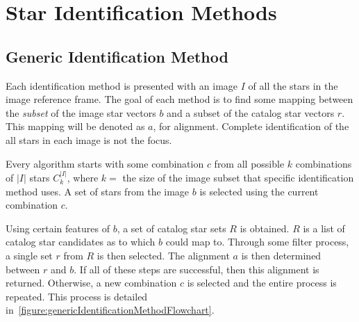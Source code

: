 \section{Star Identification Methods}\label{sec:starIdentificationMethods}

\subsection{Generic Identification Method}\label{subsec:genericIdentificationMethod}
Each identification method is presented with an image $I$ of all the stars in the image reference frame. The goal of
each method is to find some mapping between the \textit{subset} of the image star vectors $b$ and a subset of the
catalog star vectors $r$. This mapping will be denoted as $a$, for alignment. Complete identification of the all stars
in each image is not the focus.

Every algorithm starts with some combination $c$ from all possible $k$ combinations of $|I|$ stars $C_k^{|I|}$, where
$k = $ the size of the image subset that specific identification method uses. A set of stars from the image $b$ is
selected using the current combination $c$.

Using certain features of $b$, a set of catalog star sets $R$ is obtained. $R$ is a list of catalog star candidates as
to which $b$ could map to. Through some filter process, a single set $r$ from $R$ is then selected. The alignment $a$
is then determined between $r$ and $b$. If all of these steps are successful, then this alignment is returned.
Otherwise, a new combination $c$ is selected and the entire process is repeated. This process is detailed
in~\autoref{figure:genericIdentificationMethodFlowchart}.

\begin{figure}
\end{figure}


